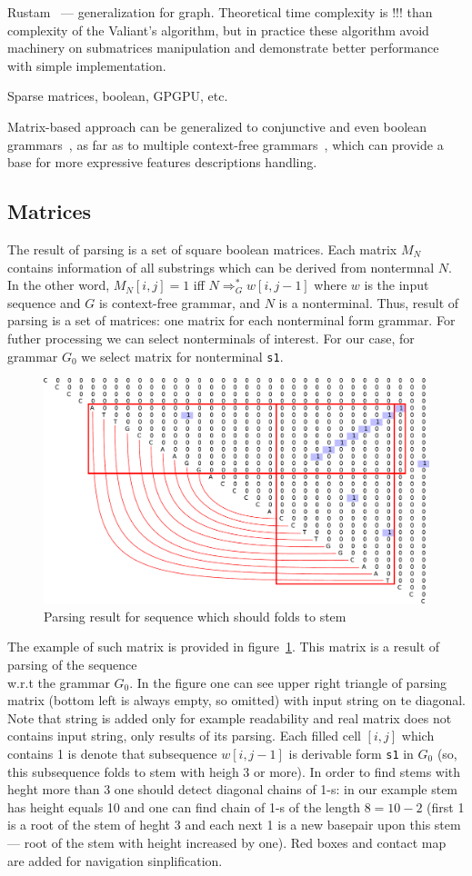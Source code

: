 \documentclass[a4paper,twoside]{article}
\begin{document}
Rustam~\cite{Azimov:2018:CPQ:3210259.3210264} --- generalization for graph. Theoretical time complexity is !!! than complexity of the Valiant's algorithm, but in practice these algorithm avoid machinery on submatrices manipulation and demonstrate better performance with simple implementation.

Sparse matrices, boolean, GPGPU, etc.

Matrix-based approach can be generalized to conjunctive and even boolean grammars~\cite{OKHOTIN2014101}, as far as to multiple context-free grammars~\cite{mcfgMatrices}, which can provide a base for more expressive features descriptions handling.

\subsection{Matrices}

\noindent The result of parsing is a set of square boolean matrices. 
Each matrix $M_N$ contains information of all substrings which can be derived from nontermnal $N$.
In the other word, $M_N[i,j]=1$ iff $N \Rightarrow^*_G w[i,j-1]$ where $w$ is the input sequence and $G$ is context-free grammar, and $N$ is a nonterminal.
Thus, result of parsing is a set of matrices: one matrix for each nonterminal form grammar.
For futher processing we can select nonterminals of interest.
For our case, for grammar $G_0$ we select matrix for nonterminal \verb|s1|.

\begin{figure}
\centering
\includegraphics[width=.5\textwidth]{figures/4.pdf}
\caption{Parsing result for sequence which should folds to stem}
\label{fig:matrix-simple-stem}
\end{figure}

The example of such matrix is provided in figure~\ref{fig:matrix-simple-stem}.
This matrix is a result of parsing of the sequence {  \\} w.r.t the grammar $G_0$.
In the figure one can see upper right triangle of parsing matrix (bottom left is always empty, so omitted) with input string on te diagonal.
Note that string is added only for example readability and real matrix does not contains input string, only results of its parsing.
Each filled cell $[i,j]$ which contains 1 is denote that subsequence $w[i,j-1]$ is derivable form \verb|s1| in $G_0$ (so, this subsequence folds to stem with heigh 3 or more).
In order to find stems with heght more than 3 one should detect diagonal chains of 1-s: in our example stem has height equals 10 and one can find chain of 1-s of the length $8=10-2$ (first 1 is a root of the stem of heght 3 and each next 1 is a new basepair upon this stem --- root of the stem with height increased by one).
Red boxes and contact map are added for navigation sinplification.
\end{document}
